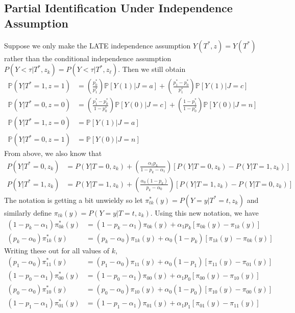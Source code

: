 \documentclass[12pt]{article}
\begin{document}
\subsection{Partial Identification Under Independence Assumption}
Suppose we only make the LATE independence assumption $Y(T^*,z) = Y(T^*)$ rather than the conditional independence assumption $P(Y<\tau|T^*,z_k) = P(Y<\tau|T^*,z_\ell)$.
Then we still obtain
\begin{align*}
  \mathbb{P}\left( Y| T^* = 1, z = 1 \right) &= \left( \frac{p_0^*}{p_1^*} \right) \mathbb{P}\left[ Y(1)|J=a \right] + \left( \frac{p_1^* - p_0^*}{p_1^*} \right)\mathbb{P}\left[ Y(1)|J=c \right] \\
  \mathbb{P}\left( Y| T^* = 0, z = 0 \right) &= \left( \frac{p_1^* - p_0^*}{1 - p_0^*} \right)\mathbb{P}\left[ Y(0)|J=c \right] + \left( \frac{1 - p_1^*}{1 - p_0^*} \right)\mathbb{P}\left[ Y(0)|J=n \right]\\
  \mathbb{P}\left( Y| T^* = 1, z = 0 \right) &= \mathbb{P}\left[ Y(1)|J=a \right]\\
  \mathbb{P}\left( Y| T^* = 0, z = 1 \right) &= \mathbb{P}\left[ Y(0)|J=n \right]
\end{align*}
From above, we also know that
\begin{align*}
  P(Y|T^*=0,z_k) &= P(Y|T=0, z_k) + \left( \frac{\alpha_1 p_k}{1 - p_k - \alpha_1} \right)\left[ P(Y|T=0,z_k) - P(Y|T=1,z_k) \right]\\
  P(Y|T^*=1,z_k) &= P(Y|T=1, z_k) + \left( \frac{\alpha_0 (1-p_k)}{p_k - \alpha_0} \right)\left[ P(Y|T=1,z_k) - P(Y|T=0,z_k) \right]
\end{align*}
The notation is getting a bit unwieldy so let $\pi^*_{tk}(y)= P(Y=y|T^*=t,z_k)$ and similarly define $\pi_{tk}(y) = P(Y=y|T=t,z_k)$.
Using this new notation, we have
\begin{align*}
  (1 - p_k - \alpha_1) \pi^*_{0k}(y) &= (1 - p_k - \alpha_1) \pi_{0k}(y) + \alpha_1 p_k \left[ \pi_{0k}(y) - \pi_{1k}(y) \right]\\
  (p_k - \alpha_0) \pi_{1k}^*(y) &= (p_k - \alpha_0) \pi_{1k}(y) + \alpha_0 (1 - p_k)\left[ \pi_{1k}(y) - \pi_{0k}(y) \right]
\end{align*}
Writing these out for all values of $k$,
\begin{align*}
  (p_1 - \alpha_0) \pi_{11}^*(y) &= (p_1 - \alpha_0) \pi_{11}(y) + \alpha_0 (1 - p_1)\left[ \pi_{11}(y) - \pi_{01}(y) \right]\\
  (1 - p_0 - \alpha_1) \pi^*_{00}(y) &= (1 - p_0 - \alpha_1) \pi_{00}(y) + \alpha_1 p_0 \left[ \pi_{00}(y) - \pi_{10}(y) \right]\\
  (p_0 - \alpha_0) \pi_{10}^*(y) &= (p_0 - \alpha_0) \pi_{10}(y) + \alpha_0 (1 - p_0)\left[ \pi_{10}(y) - \pi_{00}(y) \right]\\
  (1 - p_1 - \alpha_1) \pi^*_{01}(y) &= (1 - p_1 - \alpha_1) \pi_{01}(y) + \alpha_1 p_1 \left[ \pi_{01}(y) - \pi_{11}(y) \right]
\end{align*}
\end{document}
